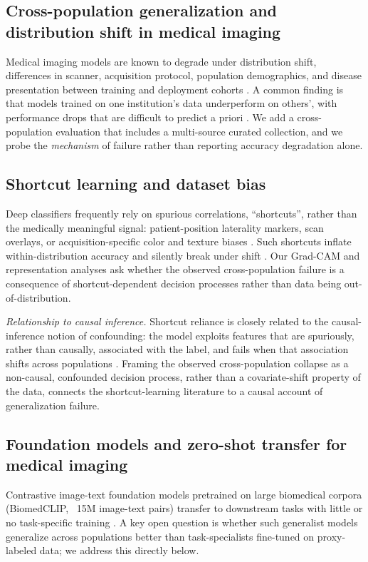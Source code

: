 \documentclass[runningheads]{llncs}
\begin{document}
\subsection{Cross-population generalization and distribution shift in medical imaging}
Medical imaging models are known to degrade under distribution shift, differences in scanner, acquisition protocol, population demographics, and disease presentation between training and deployment cohorts \cite{su2024}. A common finding is that models trained on one institution's data underperform on others', with performance drops that are difficult to predict a priori \cite{rajpurkar2020}. We add a cross-population evaluation that includes a multi-source curated collection, and we probe the \emph{mechanism} of failure rather than reporting accuracy degradation alone.

\subsection{Shortcut learning and dataset bias}
Deep classifiers frequently rely on spurious correlations, ``shortcuts'', rather than the medically meaningful signal: patient-position laterality markers, scan overlays, or acquisition-specific color and texture biases \cite{geirhos2020,zech2018}. Such shortcuts inflate within-distribution accuracy and silently break under shift \cite{geirhos2020}. Our Grad-CAM and representation analyses ask whether the observed cross-population failure is a consequence of shortcut-dependent decision processes rather than data being out-of-distribution.

\emph{Relationship to causal inference.} Shortcut reliance is closely related to the causal-inference notion of confounding: the model exploits features that are spuriously, rather than causally, associated with the label, and fails when that association shifts across populations \cite{pearl2009}. Framing the observed cross-population collapse as a non-causal, confounded decision process, rather than a covariate-shift property of the data, connects the shortcut-learning literature to a causal account of generalization failure.

\subsection{Foundation models and zero-shot transfer for medical imaging}
Contrastive image-text foundation models pretrained on large biomedical corpora (BiomedCLIP, ~15M image-text pairs) transfer to downstream tasks with little or no task-specific training \cite{zhang2023}. A key open question is whether such generalist models generalize across populations better than task-specialists fine-tuned on proxy-labeled data; we address this directly below.
\end{document}
